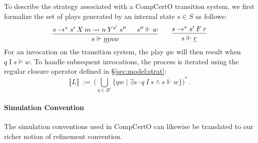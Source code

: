 \documentclass[acmsmall,nonacm]{acmart}
\newcommand{\kw}[1]{\ensuremath{ \mathsf{#1} }}
\newcommand{\que}{\circ}
\begin{document}

To describe the strategy associated with a CompCertO transition system,
we first formalize the set of plays generated by an internal state $s \in S$ as follows:
\[
  \begin{prooftree}
    \hypo{s \rightarrow^* s' \: X \: m \leadsto n \: Y^{s'} \: s''}
    \hypo{s'' \Vdash w}
    \infer2{s \Vdash \underline{m}nw}
  \end{prooftree}
  \qquad
  \begin{prooftree}
    \hypo{s \rightarrow^* s' \: F \: r}
    \infer1{s \Vdash \underline{r}}
  \end{prooftree}
\]
For an invocation on the transition system,
the play $qw$ will then result when $q \mathrel{I} s \vDash w$.
To handle subsequent invocations,
the process is iterated using the regular closure operator
defined in \S\ref{sec:model:strat}:
\[
  \llbracket L \rrbracket \: := \:
  \Big(\bigcup_{q \in B^\que} \{ qw \mid \exists s \cdot q \: I \: s \wedge s \Vdash w \} \Big)^*
  \,.
\]

\paragraph{Simulation Convention}

The simulation conventions used in CompCertO
can likewise be translated to our richer notion of
refinement convention.

\end{document}
